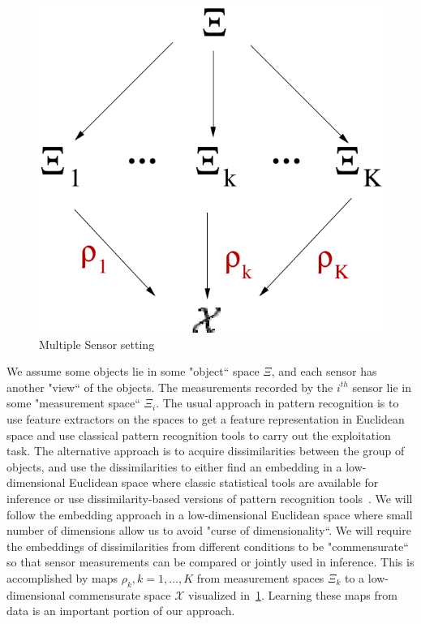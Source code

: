 \documentclass[11pt]{article} %
\begin{document}
\begin{figure}
\includegraphics[scale=0.35]{gen-model-orig-proj.pdf}
\caption{Multiple Sensor setting}
\label{fig:fig1}
\end{figure}


We assume some objects lie in some "object`` space $\Xi$, and each sensor has another "view`` of the objects. The measurements recorded by the $i^{th}$ sensor lie in some "measurement space`` $\Xi_i$. The usual approach in pattern recognition is to use feature extractors on the spaces to get a feature representation in Euclidean space and use classical pattern recognition tools to carry out the exploitation task. The alternative approach is to acquire dissimilarities between the group of objects, and use the dissimilarities to either find an embedding in a low-dimensional Euclidean space where classic statistical tools are available for inference or use dissimilarity-based versions of pattern recognition tools~\cite{duin2005dissimilarity}. We will follow the embedding approach in a  low-dimensional Euclidean space where small number of dimensions allow us to avoid "curse of dimensionality``. We will require the embeddings of dissimilarities from  different conditions to be "commensurate`` so that sensor measurements can be compared or jointly used in inference. This is accomplished by maps $\rho_k,k=1,\ldots,K$ from measurement spaces $\Xi_k$ to a low-dimensional commensurate space $\mathcal{X}$ visualized in~\ref{fig:fig1}. Learning these maps from data is  an important portion of our approach.
\end{document}
